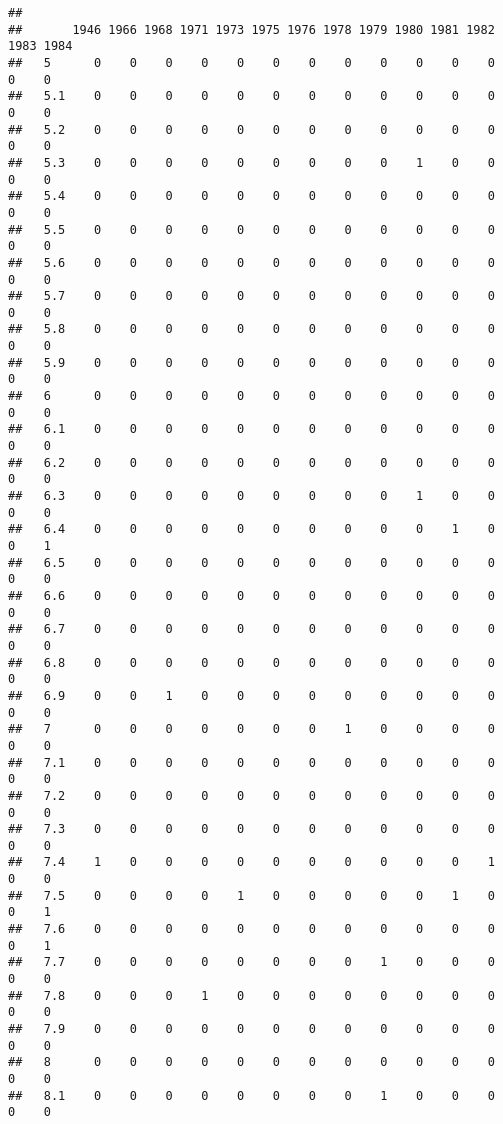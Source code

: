 \documentclass[
]{article}
\begin{document}
\begin{verbatim}
##      
##       1946 1966 1968 1971 1973 1975 1976 1978 1979 1980 1981 1982 1983 1984
##   5      0    0    0    0    0    0    0    0    0    0    0    0    0    0
##   5.1    0    0    0    0    0    0    0    0    0    0    0    0    0    0
##   5.2    0    0    0    0    0    0    0    0    0    0    0    0    0    0
##   5.3    0    0    0    0    0    0    0    0    0    1    0    0    0    0
##   5.4    0    0    0    0    0    0    0    0    0    0    0    0    0    0
##   5.5    0    0    0    0    0    0    0    0    0    0    0    0    0    0
##   5.6    0    0    0    0    0    0    0    0    0    0    0    0    0    0
##   5.7    0    0    0    0    0    0    0    0    0    0    0    0    0    0
##   5.8    0    0    0    0    0    0    0    0    0    0    0    0    0    0
##   5.9    0    0    0    0    0    0    0    0    0    0    0    0    0    0
##   6      0    0    0    0    0    0    0    0    0    0    0    0    0    0
##   6.1    0    0    0    0    0    0    0    0    0    0    0    0    0    0
##   6.2    0    0    0    0    0    0    0    0    0    0    0    0    0    0
##   6.3    0    0    0    0    0    0    0    0    0    1    0    0    0    0
##   6.4    0    0    0    0    0    0    0    0    0    0    1    0    0    1
##   6.5    0    0    0    0    0    0    0    0    0    0    0    0    0    0
##   6.6    0    0    0    0    0    0    0    0    0    0    0    0    0    0
##   6.7    0    0    0    0    0    0    0    0    0    0    0    0    0    0
##   6.8    0    0    0    0    0    0    0    0    0    0    0    0    0    0
##   6.9    0    0    1    0    0    0    0    0    0    0    0    0    0    0
##   7      0    0    0    0    0    0    0    1    0    0    0    0    0    0
##   7.1    0    0    0    0    0    0    0    0    0    0    0    0    0    0
##   7.2    0    0    0    0    0    0    0    0    0    0    0    0    0    0
##   7.3    0    0    0    0    0    0    0    0    0    0    0    0    0    0
##   7.4    1    0    0    0    0    0    0    0    0    0    0    1    0    0
##   7.5    0    0    0    0    1    0    0    0    0    0    1    0    0    1
##   7.6    0    0    0    0    0    0    0    0    0    0    0    0    0    1
##   7.7    0    0    0    0    0    0    0    0    1    0    0    0    0    0
##   7.8    0    0    0    1    0    0    0    0    0    0    0    0    0    0
##   7.9    0    0    0    0    0    0    0    0    0    0    0    0    0    0
##   8      0    0    0    0    0    0    0    0    0    0    0    0    0    0
##   8.1    0    0    0    0    0    0    0    0    1    0    0    0    0    0

\end{verbatim}
\end{document}
